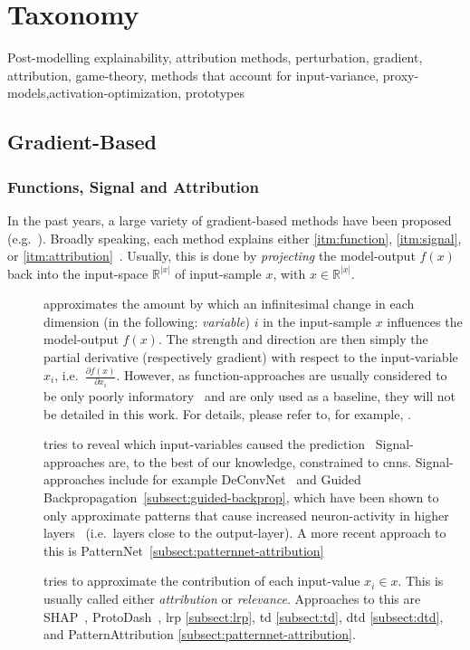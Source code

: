 \section{Taxonomy}
Post-modelling explainability, attribution methods, perturbation, gradient, attribution, game-theory, methods that account for input-variance, proxy-models,activation-optimization, prototypes

\subsection{Gradient-Based}
\subsubsection{Functions, Signal and Attribution}
In the past years, a large variety of gradient-based methods have been proposed (e.g.~\cite{Bach.2015,Zeiler.2014,Springenberg.2015,Kindermans.2018,Lundberg.2017,Gurumoorthy.2017,Simonyan.2014,DanielSmilkov.,Sundararajan.2017,Landecker.2013,Zhang.2018,Shrikumar.,Selvaraju.2017}). Broadly speaking, each method explains either \ref{itm:function}, \ref{itm:signal}, or \ref{itm:attribution}~\cite{Kindermans.2018,Kindermans.2019}. Usually, this is done by \textit{projecting} the model-output \(f(x)\) back into the input-space \(\mathbb{R}^{|x|}\) of input-sample \(x\), with \(x\in \mathbb{R}^{|x|}\).
\begin{description}
    \item[] approximates the amount by which an infinitesimal change in each dimension (in the following: \textit{variable}) \(i\) in the input-sample \(x\) influences the model-output \(f(x)\). The strength and direction are then simply the partial derivative (respectively gradient) with respect to the input-variable \(x_i\), i.e.\ \(\frac{\partial f(x)}{\partial x_i}\). However, as function-approaches are usually considered to be only poorly informatory~\cite{Kindermans.2018} and are only used as a baseline, they will not be detailed in this work. For details, please refer to, for example, .
    \item[] tries to reveal which input-variables caused the prediction~\cite{Kindermans.2018,Zeiler.2014} Signal-approaches are, to the best of our knowledge, constrained to \glspl{cnn}. Signal-approaches include for example DeConvNet~\cite{Zeiler.2014} and Guided Backpropagation~\cref{subsect:guided-backprop}, which have been shown to only approximate patterns that cause increased neuron-activity in higher layers~\cite{Kindermans.2019} (i.e.\ layers close to the output-layer). A more recent approach to this is PatternNet~\cref{subsect:patternnet-attribution}
    \item[] tries to approximate the contribution of each input-value \(x_i\in x\). This is usually called either \textit{attribution} or \textit{relevance}. Approaches to this are SHAP~\cite{Lundberg.2017}, ProtoDash~\cite{Gurumoorthy.2017}, \gls{lrp} \cref{subsect:lrp}, \gls{td} \cref{subsect:td}, \gls{dtd} \cref{subsect:dtd}, and PatternAttribution \cref{subsect:patternnet-attribution}.
\end{description}

